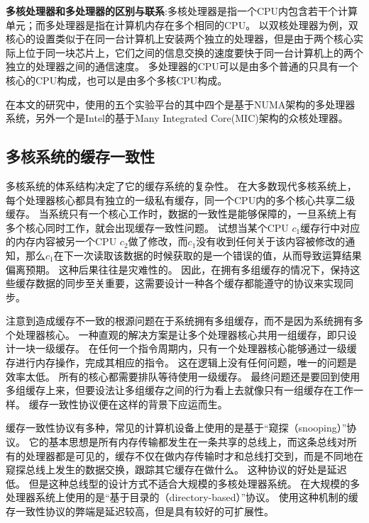 \textbf{多核处理器和多处理器的区别与联系}:多核处理器是指一个CPU内包含若干个计算单元；而多处理器是指在计算机内存在多个相同的CPU。
以双核处理器为例，双核心的设置类似于在同一台计算机上安装两个独立的处理器，但是由于两个核心实际上位于同一块芯片上，它们之间的信息交换的速度要快于同一台计算机上的两个独立的处理器之间的通信速度。
多处理器的CPU可以是由多个普通的只具有一个核心的CPU构成，也可以是由多个多核CPU构成。

在本文的研究中，使用的五个实验平台的其中四个是基于NUMA架构的多处理器系统，另外一个是Intel的基于Many Integrated Core(MIC)架构的众核处理器。

\subsection{多核系统的缓存一致性}
多核系统的体系结构决定了它的缓存系统的复杂性。
在大多数现代多核系统上，每个处理器核心都具有独立的一级私有缓存，同一个CPU内的多个核心共享二级缓存。
当系统只有一个核心工作时，数据的一致性是能够保障的，一旦系统上有多个核心同时工作，就会出现缓存一致性问题。
试想当某个CPU $c_1$缓存行中对应的内存内容被另一个CPU $c_2$做了修改，而$c_1$没有收到任何关于该内容被修改的通知，那么$c_1$在下一次读取该数据的时候获取的是一个错误的值，从而导致运算结果偏离预期。
这种后果往往是灾难性的。
因此，在拥有多组缓存的情况下，保持这些缓存数据的同步至关重要，这需要设计一种各个缓存都能遵守的协议来实现同步。

注意到造成缓存不一致的根源问题在于系统拥有多组缓存，而不是因为系统拥有多个处理器核心。
一种直观的解决方案是让多个处理器核心共用一组缓存，即只设计一块一级缓存。
在任何一个指令周期内，只有一个处理器核心能够通过一级缓存进行内存操作，完成其相应的指令。
这在逻辑上没有任何问题，唯一的问题是效率太低。
所有的核心都需要排队等待使用一级缓存。
最终问题还是要回到使用多组缓存上来，但要设法让多组缓存之间的行为看上去就像只有一组缓存在工作一样。
缓存一致性协议便在这样的背景下应运而生。

缓存一致性协议有多种，常见的计算机设备上使用的是基于“窥探（snooping）”协议。
它的基本思想是所有内存传输都发生在一条共享的总线上，而这条总线对所有的处理器都是可见的，缓存不仅在做内存传输时才和总线打交到，而是不同地在窥探总线上发生的数据交换，跟踪其它缓存在做什么。
这种协议的好处是延迟低。
但是这种总线型的设计方式不适合大规模的多核处理器系统。
在大规模的多处理器系统上使用的是“基于目录的（directory-based）”协议。
使用这种机制的缓存一致性协议的弊端是延迟较高，但是具有较好的可扩展性。

